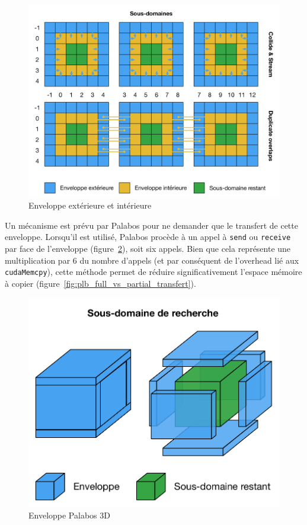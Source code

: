 \begin{figure}[h]
	\centering
	\includegraphics[scale=0.62, fbox]{images/enveloppes_interrieures_exeterrieures.pdf}
	\caption{Enveloppe extérieure et intérieure}
	\label{fig:plb_enveloppes}
\end{figure}

Un mécanisme est prévu par Palabos pour ne demander que le transfert de cette enveloppe. Lorsqu'il est utilisé, Palabos procède à un appel à \texttt{send} ou \texttt{receive} par face de l'enveloppe (figure~\ref{fig:plb_enveloppe_3d}), soit six appels. Bien que cela représente une multiplication par 6 du nombre d'appels (et par conséquent de l'overhead lié aux \texttt{cudaMemcpy}), cette méthode permet de réduire significativement l'espace mémoire à copier (figure~\ref{fig:plb_full_vs_partial_transfert}).

\begin{figure}[h]
	\centering
	\includegraphics[scale=0.75, fbox]{images/enveloppe_3d_palabos.pdf}
	\caption{Enveloppe Palabos 3D}
	\label{fig:plb_enveloppe_3d}
\end{figure}


